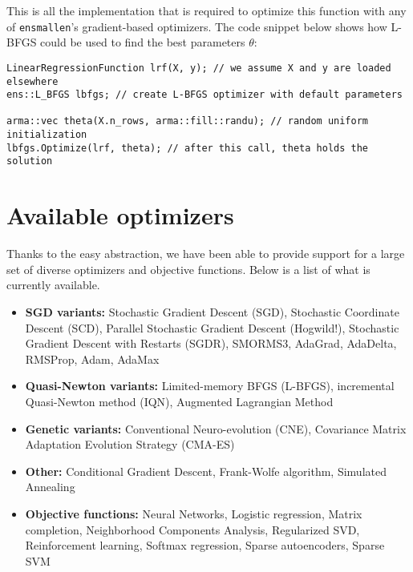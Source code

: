 \documentclass{article}
\begin{document}
This is all the implementation that is required to optimize this function with
any of {\tt ensmallen}'s gradient-based optimizers.  The code snippet below
shows how L-BFGS could be used to find the best parameters $\theta$:

\begin{verbatim}
LinearRegressionFunction lrf(X, y); // we assume X and y are loaded elsewhere
ens::L_BFGS lbfgs; // create L-BFGS optimizer with default parameters

arma::vec theta(X.n_rows, arma::fill::randu); // random uniform initialization
lbfgs.Optimize(lrf, theta); // after this call, theta holds the solution
\end{verbatim}


\section{Available optimizers}

Thanks to the easy abstraction, we have been able to provide support for a large
set of diverse optimizers and objective functions.  Below is a list of what is
currently available.

\vspace*{-0.4em}
\begin{itemize} \itemsep -1pt
  \item {\bf SGD variants:} Stochastic Gradient Descent (SGD), Stochastic
      Coordinate Descent (SCD), Parallel Stochastic Gradient Descent (Hogwild!),
      Stochastic Gradient Descent with Restarts (SGDR), SMORMS3, AdaGrad,
      AdaDelta, RMSProp, Adam, AdaMax

  \item {\bf Quasi-Newton variants:} Limited-memory BFGS (L-BFGS), incremental
        Quasi-Newton method (IQN), Augmented Lagrangian Method

  \item {\bf Genetic variants:} Conventional Neuro-evolution (CNE), Covariance
        Matrix Adaptation Evolution Strategy (CMA-ES)

  \item {\bf Other:} Conditional Gradient Descent, Frank-Wolfe algorithm, Simulated Annealing

  \item {\bf Objective functions:} Neural Networks, Logistic regression,
      Matrix completion, Neighborhood Components Analysis, Regularized SVD,
      Reinforcement learning, Softmax regression, Sparse autoencoders,
      Sparse SVM
\end{itemize}
\vspace*{-0.4em}
\end{document}
